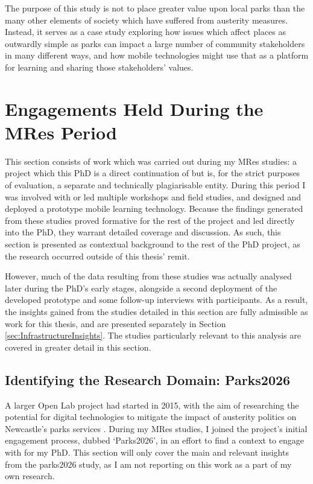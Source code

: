 The purpose of this study is not to place greater value upon local parks than the many other elements of society which have suffered from austerity measures. Instead, it serves as a case study exploring how issues which affect places as outwardly simple as parks can impact a large number of community stakeholders in many different ways, and how mobile technologies might use that as a platform for learning and sharing those stakeholders' values.

\section{Engagements Held During the MRes Period}

This section consists of work which was carried out during my MRes studies: a project which this PhD is a direct continuation of but is, for the strict purposes of evaluation, a separate and technically plagiarisable entity. During this period I was involved with or led multiple workshops and field studies, and designed and deployed a prototype mobile learning technology. Because the findings generated from these studies proved formative for the rest of the project and led directly into the PhD, they warrant detailed coverage and discussion. As such, this section is presented as contextual background to the rest of the PhD project, as the research occurred outside of this thesis' remit.  

However, much of the data resulting from these studies was actually analysed later during the PhD's early stages, alongside a second deployment of the developed prototype and some follow-up interviews with participants. As a result, the insights gained from the studies detailed in this section are fully admissible as work for this thesis, and are presented separately in Section \ref{sec:InfrastructureInsights}. The studies particularly relevant to this analysis are covered in greater detail in this section.

\subsection{Identifying the Research Domain: Parks2026}
\label{sec:Parks2026}

A larger Open Lab project had started in 2015, with the aim of researching the potential for digital technologies to mitigate the impact of austerity politics on Newcastle's parks services \citep{Crivellaro2019}. During my MRes studies, I joined the project's initial engagement process, dubbed `Parks2026', in an effort to find a context to engage with for my PhD. This section will only cover the main and relevant insights from the parks2026 study, as I am not reporting on this work as a part of my own research.

